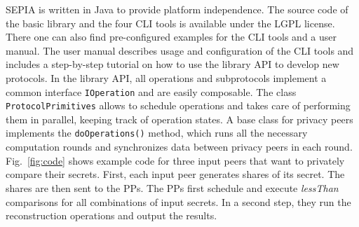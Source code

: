 \documentclass[letterpaper,11pt,onecolumn,titlepage]{article}
\begin{document}
SEPIA is written in Java to provide platform independence. 
The source code of the basic library and the four CLI tools is available under the LGPL license. 
There one can also find pre-configured examples for the CLI tools and a user manual. The user manual describes usage and configuration of the CLI tools and includes a step-by-step
tutorial on how to use the library API to develop new protocols.
In the library API, all operations and subprotocols implement a common interface 
\texttt{IOperation} and are easily composable. The class \texttt{Protocol\-Primitives} 
allows to schedule operations and takes care of performing them in parallel, keeping track of operation states. A base class for privacy peers 
implements the \texttt{doOperations()} method, which runs all the necessary computation rounds
and synchronizes data between privacy peers in each round. Fig.~\ref{fig:code} shows example code for three input peers that want to privately compare their secrets.
First, each input peer generates shares of its secret. The shares are then sent to the PPs. The PPs first schedule and execute \emph{lessThan} comparisons for all combinations of input secrets. In a second step, they run the reconstruction operations and output the results.
\end{document}
